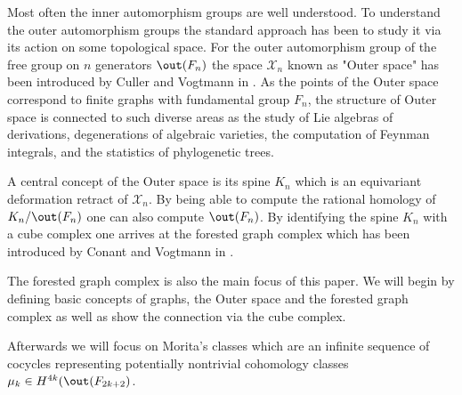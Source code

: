 Most often the inner automorphism groups are well understood.  To understand the outer automorphism groups
the standard approach has been to study it via its action on some topological space.
For the outer automorphism group of the free group on $n$ generators $\out(F_{n})$ the space $\mathcal{X}_{n}$ known as "Outer space"
has been introduced by Culler and Vogtmann in \cite{vogtmann86}. As the points of the Outer space correspond to finite graphs with fundamental group $F_{n}$,
the structure of Outer space is connected to such diverse areas as the study of Lie algebras of derivations, degenerations of algebraic varieties,
the computation of Feynman integrals, and the statistics of phylogenetic trees.

A central concept of the Outer space is its spine $K_{n}$ which is an equivariant deformation retract of $\mathcal{X}_{n}$.
By being able to compute the rational homology of $K_{n} / \out(F_{n})$ one can also compute $\out(F_{n})$.
By identifying the spine $K_{n}$ with a cube complex one arrives at the forested graph complex
which has been introduced by Conant and Vogtmann in \cite{conant03}.

The forested graph complex is also the main focus of this paper.
We will begin by defining basic concepts of graphs, the Outer space and the forested graph complex as well as show the connection via the cube complex.

Afterwards we will focus on Morita's classes which are an infinite sequence of cocycles representing potentially nontrivial cohomology classes $\mu_{k} \in H^{4k}(\out(F_{2k+2})$.




